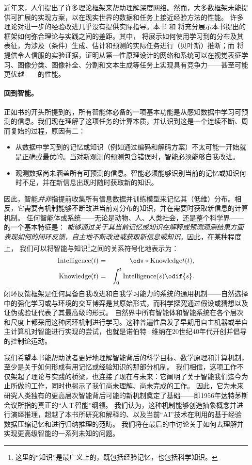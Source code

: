 \documentclass[../../book-main_zh.tex]{subfiles}
\begin{document}
近年来，人们提出了许多理论框架来帮助理解深度网络。然而，大多数框架未能提供可扩展的实现方案，以在现实世界的数据和任务上接近经验方法的性能。
许多理论对进一步的经验改进几乎没有提供实际指导。本书
和  将充分展示本书提出的框架如何弥合理论与实践之间的差距。其中，
将展示如何使用学习到的分布及其表征，为涉及（条件）生成、估计和预测的实际任务进行（贝叶斯）推断；而
将提供令人信服的实验证据，证明从第一性原理设计的网络和系统可以在视觉表征学习、图像分类、图像补全、分割和文本生成等任务上实现具有竞争力——甚至可能更优越——的性能。

\paragraph{回到智能。}
正如书的开头所提到的，所有智能体必备的一项基本功能是从感知数据中学习可预测的信息。我们现在理解了这项任务的计算本质，并认识到这是一个连续不断、周而复始的过程，原因有二：
\begin{itemize}
    \item 从数据中学习到的记忆或知识（例如通过编码和解码方案）不太可能一开始就是正确或最优的。当对新观测的预测包含错误时，智能必须能够自我改进。
    \item 观测数据尚未涵盖所有可预测的信息。智能必须能够识别当前的记忆或知识何时不足，并在新信息出现时随时获取新的知识。
\end{itemize}

因此，智能\textit{并非}指提前收集所有信息数据并训练模型来记忆其（低维）分布。相反，它需要有机制能够不断改进当前对分布的知识，并在需要时获取新信息的计算机制。
任何智能体或系统——无论是动物、人、人类社会，还是整个科学界——的一个基本特征是：
\textit{能够通过关于其当前记忆或知识在解释或预测观测结果方面表现如何的闭环反馈，自主地不断改进或获取新信息或知识}。因此，在某种程度上，
我们可以将智能与知识\footnote{这里的“知识”是最广义上的，既包括经验记忆，也包括科学知识。}之间的关系符号化地表示为：
\begin{eqnarray*}
    \operatorname{Intelligence}(t) &=&
    \odv*{\operatorname{Knowledge}}{t}(t), \\
    \operatorname{Knowledge}(t)  &=& \int_{0}^{t}
    \operatorname{Intelligence}(s) \odif{s}.
\end{eqnarray*}
闭环反馈框架是任何具备自我改进和自我学习能力的系统的通用机制——自然选择中的强化学习或与环境的交互博弈是其原始形式，而科学探究通过假设或猜想以及证伪或验证代表了其最高级的形式。
自然界中所有智能体和智能系统在各个层次和尺度上都采用这种闭环机制进行学习。这种普遍性启发了早期用自主机器或半自主计算机对智能进行实现的尝试，也就是诺伯特·维纳在20世纪40年代开创并倡导的控制论运动。

我们希望本书能帮助读者更好地理解智能背后的科学目标、数学原理和计算机制，至少是关于如何形成有用记忆或经验知识的那部分机制。
我们相信，这项工作不仅架起了理论与实践的桥梁，也连接了现在与未来：它阐明了关于智能我们迄今为止所做的工作，同时也揭示了我们尚未理解、尚未完成的工作。
因此，它为未来研究人类独有的更高层次智能背后可能的新机制奠定了基础——即1956年达特茅斯会议所指的真正的“人工智能”纲领。
我们认为，这种机制能够创造抽象概念并进行演绎推理，超越了本书所研究和解释的、以及当前“AI”技术在利用的基于经验数据压缩记忆和进行归纳推理的范畴。
我们将在最后的中讨论关于如何去理解并实现更高级智能的一系列未知的问题。
\end{document}
